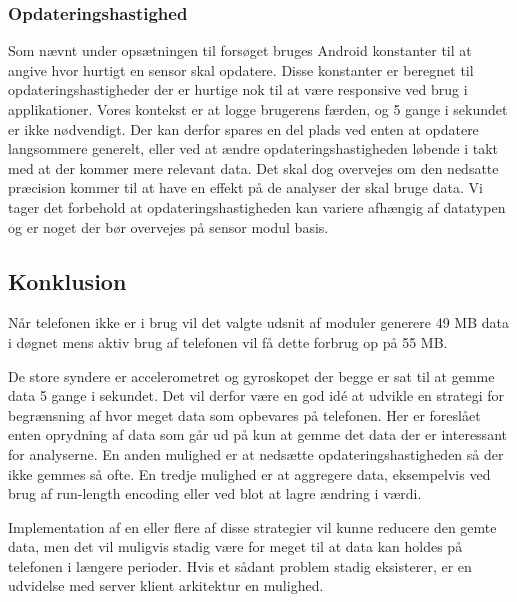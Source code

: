 \subsubsection{Opdateringshastighed}
Som nævnt under opsætningen til forsøget bruges Android konstanter til at angive hvor hurtigt en sensor skal opdatere.
Disse konstanter er beregnet til opdateringshastigheder der er hurtige nok til at være responsive ved brug i applikationer.
Vores kontekst er at logge brugerens færden, og 5 gange i sekundet er ikke nødvendigt.
Der kan derfor spares en del plads ved enten at opdatere langsommere generelt, eller ved at ændre opdateringshastigheden løbende i takt med at der kommer mere relevant data.
Det skal dog overvejes om den nedsatte præcision kommer til at have en effekt på de analyser der skal bruge data.
Vi tager det forbehold at opdateringshastigheden kan variere afhængig af datatypen og er noget der bør overvejes på sensor modul basis.

\subsection{Konklusion}
Når telefonen ikke er i brug vil det valgte udsnit af moduler generere 49 MB data i døgnet mens aktiv brug af telefonen vil få dette forbrug op på 55 MB.

De store syndere er accelerometret og gyroskopet der begge er sat til at gemme data 5 gange i sekundet.
Det vil derfor være en god idé at udvikle en strategi for begrænsning af hvor meget data som opbevares på telefonen.
Her er foreslået enten oprydning af data som går ud på kun at gemme det data der er interessant for analyserne.
En anden mulighed er at nedsætte opdateringshastigheden så der ikke gemmes så ofte.
En tredje mulighed er at aggregere data, eksempelvis ved brug af run-length encoding eller ved blot at lagre ændring i værdi.

Implementation af en eller flere af disse strategier vil kunne reducere den gemte data, men det vil muligvis stadig være for meget til at data kan holdes på telefonen i længere perioder.
Hvis et sådant problem stadig eksisterer, er en udvidelse med server klient arkitektur en mulighed.